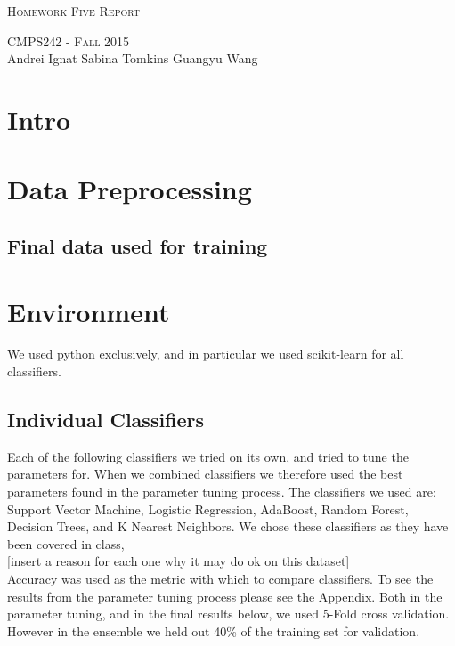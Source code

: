 \documentclass{article}
\begin{document}
\begin{center}
\Huge{\textsc{Homework Five Report}} 

\Large\textsc{CMPS242 - Fall 2015}\\

\large{Andrei Ignat  \hfill Sabina Tomkins \hfill Guangyu Wang} 
\end{center}


\section{Intro}

\section{Data Preprocessing}

\subsection{Final data used for training}

\section{Environment}
We used python exclusively, and in particular we used scikit-learn for all classifiers. 



\subsection{Individual Classifiers}
Each of the following classifiers we tried on its own, and tried to tune the parameters for. When we combined classifiers we therefore used the best parameters found in the parameter tuning process. The classifiers we used are: Support Vector Machine, Logistic Regression, AdaBoost, Random Forest, Decision Trees, and K Nearest Neighbors. We chose these classifiers as they have been covered in class, \\

[insert a reason for each one why it may do ok on this dataset]  \\

Accuracy was used as the metric with which to compare classifiers. To see the results from the parameter tuning process please see the Appendix. Both in the parameter tuning, and in the final results below, we used 5-Fold cross validation. However in the ensemble we held out 40\% of the training set for validation.\\
\end{document}
